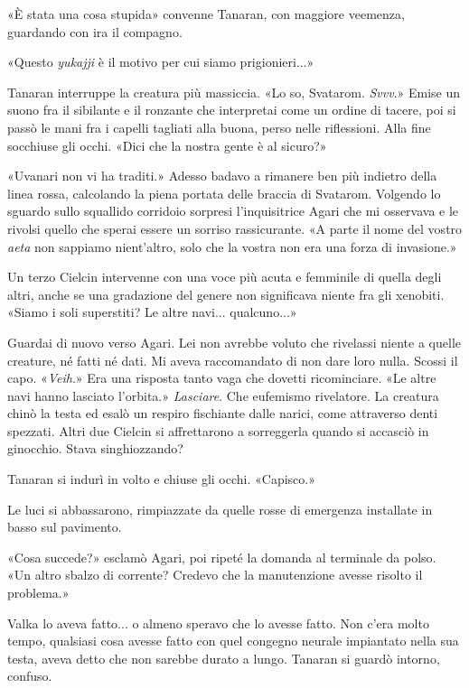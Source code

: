 «È stata una cosa stupida» convenne Tanaran, con maggiore veemenza,
guardando con ira il compagno.

«Questo \emph{yukajji} è il motivo per cui siamo prigionieri...»

Tanaran interruppe la creatura più massiccia. «Lo so, Svatarom.
\emph{Svvv}.» Emise un suono fra il sibilante e il ronzante che
interpretai come un ordine di tacere, poi si passò le mani fra i capelli
tagliati alla buona, perso nelle riflessioni. Alla fine socchiuse gli
occhi. «Dici che la nostra gente è al sicuro?»

«Uvanari non vi ha traditi.» Adesso badavo a rimanere ben più indietro
della linea rossa, calcolando la piena portata delle braccia di
Svatarom. Volgendo lo sguardo sullo squallido corridoio sorpresi
l'inquisitrice Agari che mi osservava e le rivolsi quello che sperai
essere un sorriso rassicurante. «A parte il nome del vostro \emph{aeta}
non sappiamo nient'altro, solo che la vostra non era una forza di
invasione.»

Un terzo Cielcin intervenne con una voce più acuta e femminile di quella
degli altri, anche se una gradazione del genere non significava niente
fra gli xenobiti. «Siamo i soli superstiti? Le altre navi...
qualcuno...»

Guardai di nuovo verso Agari. Lei non avrebbe voluto che rivelassi
niente a quelle creature, né fatti né dati. Mi aveva raccomandato di non
dare loro nulla. Scossi il capo. «\emph{Veih}.» Era una risposta tanto
vaga che dovetti ricominciare. «Le altre navi hanno lasciato l'orbita.»
\emph{Lasciare}. Che eufemismo rivelatore. La creatura chinò la testa ed
esalò un respiro fischiante dalle narici, come attraverso denti
spezzati. Altri due Cielcin si affrettarono a sorreggerla quando si
accasciò in ginocchio. Stava singhiozzando?

Tanaran si indurì in volto e chiuse gli occhi. «Capisco.»

Le luci si abbassarono, rimpiazzate da quelle rosse di emergenza
installate in basso sul pavimento.

«Cosa succede?» esclamò Agari, poi ripeté la domanda al terminale da
polso. «Un altro sbalzo di corrente? Credevo che la manutenzione avesse
risolto il problema.»

Valka lo aveva fatto... o almeno speravo che lo avesse fatto. Non c'era
molto tempo, qualsiasi cosa avesse fatto con quel congegno neurale
impiantato nella sua testa, aveva detto che non sarebbe durato a lungo.
Tanaran si guardò intorno, confuso.

